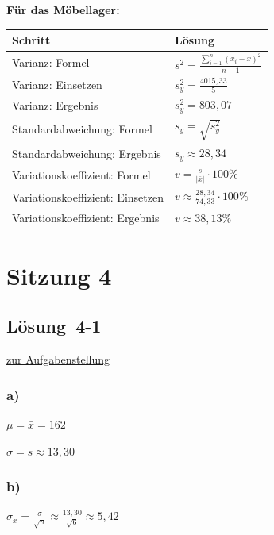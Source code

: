 \documentclass[
  11pt,
  ngerman,
  a4paper,
]{report}
\begin{document}
\textbf{Für das Möbellager:}

\begin{table}[H]
\centering
\begin{tabular}{ll}
\toprule
\textbf{Schritt} & \textbf{Lösung}\\
\midrule
Varianz: Formel & $s^2=\frac{\sum\limits_{i=1}^{n}(x_{i}-\bar{x})^2}{n-1}$\\
Varianz: Einsetzen & $s^2_y=\frac{4015{,}33}{5}$\\
Varianz: Ergebnis & $s^2_y=803{,}07$\\
Standardabweichung: Formel & $s_y=\sqrt{s^2_y}$\\
Standardabweichung: Ergebnis & $s_y\approx28{,}34$\\
Variationskoeffizient: Formel & $v=\frac{s}{|\bar{x}|}\cdot100\%$\\
Variationskoeffizient: Einsetzen & $v\approx\frac{28{,}34}{74{,}33}\cdot100\%$\\
Variationskoeffizient: Ergebnis & $v \approx 38{,}13\%$\\
\bottomrule
\end{tabular}
\end{table}

\hypertarget{sitzung-4}{%
\section*{Sitzung 4}\label{sitzung-4}}

\hypertarget{loesung-4-1}{%
\subsection{Lösung~4-1}\label{loesung-4-1}}

\protect\hyperlink{aufgabe-4-1}{zur Aufgabenstellung}

\hypertarget{a-14}{%
\subsubsection{a)}\label{a-14}}

\(\mu = \bar{x} = 162\)

\(\sigma = s \approx 13{,}30\)

\hypertarget{b-14}{%
\subsubsection{b)}\label{b-14}}

\(\sigma_{\bar{x}} = \frac{\sigma}{\sqrt{n}}\approx\frac{13{,}30}{\sqrt{6}} \approx 5,42\)
\end{document}
